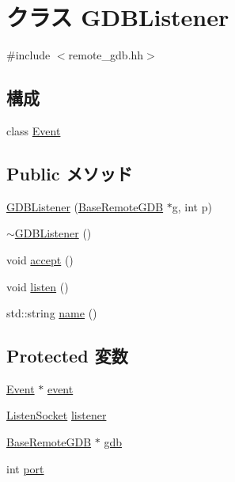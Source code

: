 \hypertarget{classGDBListener}{
\section{クラス GDBListener}
\label{classGDBListener}
}


{\ttfamily \#include $<$remote\_\-gdb.hh$>$}\subsection*{構成}
\begin{DoxyCompactItemize}
\item 
class \hyperlink{classGDBListener_1_1Event}{Event}
\end{DoxyCompactItemize}
\subsection*{Public メソッド}
\begin{DoxyCompactItemize}
\item 
\hyperlink{classGDBListener_aa8b3c682f637e2fe4d93e2623219ee37}{GDBListener} (\hyperlink{classBaseRemoteGDB}{BaseRemoteGDB} $\ast$g, int p)
\item 
\hyperlink{classGDBListener_afe14217db64403242d45b6e321a389a6}{$\sim$GDBListener} ()
\item 
void \hyperlink{classGDBListener_aadb9f3b844fb4cf98288cd3c60a3af91}{accept} ()
\item 
void \hyperlink{classGDBListener_a458bbe4cf81360301586b2e62a7f9dd2}{listen} ()
\item 
std::string \hyperlink{classGDBListener_aa62b508d2c0e7d9cec12924965276eb5}{name} ()
\end{DoxyCompactItemize}
\subsection*{Protected 変数}
\begin{DoxyCompactItemize}
\item 
\hyperlink{classGDBListener_1_1Event}{Event} $\ast$ \hyperlink{classGDBListener_a765488c8f26c7f8713d5245212dcae01}{event}
\item 
\hyperlink{classListenSocket}{ListenSocket} \hyperlink{classGDBListener_acf9ea448b26a541b4a197f1ca92f700b}{listener}
\item 
\hyperlink{classBaseRemoteGDB}{BaseRemoteGDB} $\ast$ \hyperlink{classGDBListener_abc7630d7a55d0751927fed9b12d7b202}{gdb}
\item 
int \hyperlink{classGDBListener_a63c89c04d1feae07ca35558055155ffb}{port}
\end{DoxyCompactItemize}
